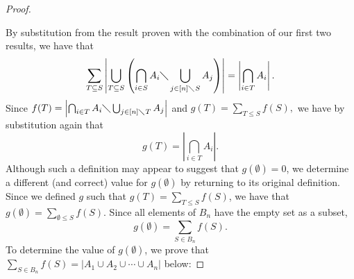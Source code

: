\documentclass{article} %
\theoremstyle{definition}
\theoremstyle{plain}
\begin{document}
\begin{proof}
\begin{enumerate}
\end{enumerate}
By substitution from the result proven with the combination of our first two results, we have that 
$$\sum_{T\subseteq S}\left|\bigcup_{T\subseteq S}\left(\bigcap_{i\in S}A_i\diagdown\bigcup_{j\in [n]\diagdown S}A_j\right)\right|=\left|\bigcap_{i\in T}A_i\right|.$$
Since $f(T)=\left|\bigcap_{i\in T}A_i\diagdown\bigcup_{j\in [n]\diagdown T}A_j\right|$
and
$g(T)=\sum_{T \le S}f(S),$ we have by substitution again that 
$$g(T)=\left|\bigcap_{i\in T}A_i\right|.$$
Although such a definition may appear to suggest that $g(\emptyset)=0$, we determine a different (and correct) value for $g(\emptyset)$ by returning to its original definition. Since we defined $g$ such that $g(T)=\sum_{T\leq S}f(S)$, we have that $g(\emptyset)=\sum_{\emptyset \leq S}f(S)$. Since all elements of $B_n$ have the empty set as a subset, 
$$g(\emptyset)=\sum_{S\in B_n}f(S).$$
To determine the value of $g(\emptyset)$, we prove that $\sum_{S\in B_n}f(S)=\left|A_1\cup A_2 \cup \cdots \cup A_n\right|$ below:

\end{proof}
\end{document}
